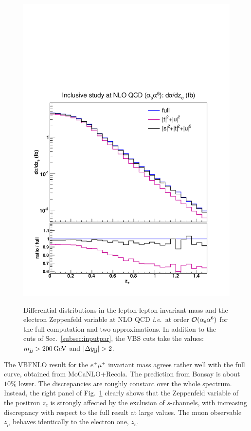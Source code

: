 \begin{figure}[hbt]
{\includegraphics[scale=0.35]{figures/scanfigures/zel_nlo.pdf}}
\caption{Differential distributions in the lepton-lepton invariant mass and the electron Zeppenfeld variable at NLO QCD \emph{i.e.}\ at order $\mathcal{O}(\alpha_\text{s}\alpha^6)$ for the full computation and two approximations.
In addition to the cuts of Sec.~\ref{subsec:inputpar}, the VBS cuts take the values: $m_{\text{j}\text{j}}>200 \,\text{GeV}$ and $|\Delta y_{\Pj\Pj}|>2$.} 
\label{fig:mjjdyjj_1d_3}
\end{figure}
%
The {\sc VBFNLO} result for the $e^+\mu^+$ invariant mass agrees rather well with the full curve, obtained from {\sc MoCa\-NLO+Recola}.
The prediction from {\sc Bonsay} is about $10\%$ lower.
The discrepancies are roughly constant over the whole spectrum.
Instead, the right panel of Fig.~\ref{fig:mjjdyjj_1d_3} clearly shows that the Zeppenfeld variable of the positron $z_e$ is strongly affected by the exclusion of $s$-channels, with increasing discrepancy with respect to the full result at large values.
The muon observable $z_{\mu}$ behaves identically to the electron one, $z_e$.

